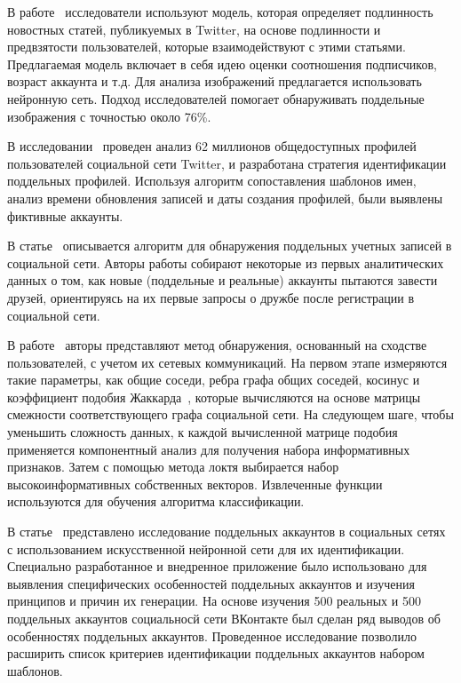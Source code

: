 В работе~\cite{UppadaMVHS22} исследователи используют модель, которая определяет подлинность новостных статей, публикуемых в Twitter, на основе подлинности и предвзятости пользователей, которые взаимодействуют с этими статьями. Предлагаемая модель включает в себя идею оценки соотношения подписчиков, возраст аккаунта и т.д. Для анализа изображений предлагается использовать нейронную сеть. Подход исследователей помогает обнаруживать поддельные изображения с точностью около 76\%.
    
В исследовании~\cite{GurajalaWHM15} проведен анализ 62 миллионов общедоступных профилей пользователей социальной сети Twitter, и разработана стратегия идентификации поддельных профилей. Используя алгоритм сопоставления шаблонов имен, анализ времени обновления записей и даты создания профилей, были выявлены фиктивные аккаунты. 

В статье~\cite{abs-2308-05353} описывается алгоритм для обнаружения поддельных учетных записей в социальной сети. Авторы работы собирают некоторые из первых аналитических данных о том, как новые (поддельные и реальные) аккаунты пытаются завести друзей, ориентируясь на их первые запросы о дружбе после регистрации в социальной сети. 

В работе~\cite{MohammadrezaeiS19} авторы представляют метод обнаружения, основанный на сходстве пользователей, с учетом их сетевых коммуникаций. На первом этапе измеряются такие параметры, как общие соседи, ребра графа общих соседей, косинус и коэффициент подобия Жаккарда~\cite{SantistebanT15}, которые вычисляются на основе матрицы смежности соответствующего графа социальной сети. На следующем шаге, чтобы уменьшить сложность данных, к каждой вычисленной матрице подобия применяется компонентный анализ для получения набора информативных признаков. Затем с помощью метода локтя выбирается набор высокоинформативных собственных векторов. Извлеченные функции используются для обучения алгоритма классификации. 

В статье~\cite{StolbovaGI21} представлено исследование поддельных аккаунтов в социальных сетях с использованием искусственной нейронной сети для их идентификации. Специально разработанное и внедренное приложение было использовано для выявления специфических особенностей поддельных аккаунтов и изучения принципов и причин их генерации. На основе изучения 500 реальных и 500 поддельных аккаунтов социальносй сети ВКонтакте был сделан ряд выводов об особенностях поддельных аккаунтов. Проведенное исследование позволило расширить список критериев идентификации поддельных аккаунтов набором шаблонов.

